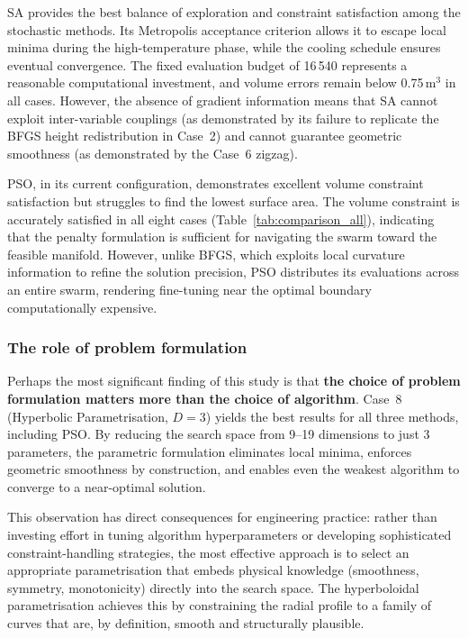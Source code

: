 SA provides the best balance of exploration and constraint satisfaction among the stochastic methods. Its Metropolis acceptance criterion allows it to escape local minima during the high-temperature phase, while the cooling schedule ensures eventual convergence. The fixed evaluation budget of 16\,540 represents a reasonable computational investment, and volume errors remain below 0.75\,m$^3$ in all cases. However, the absence of gradient information means that SA cannot exploit inter-variable couplings (as demonstrated by its failure to replicate the BFGS height redistribution in Case~2) and cannot guarantee geometric smoothness (as demonstrated by the Case~6 zigzag).

PSO, in its current configuration, demonstrates excellent volume constraint satisfaction but struggles to find the lowest surface area. The volume constraint is accurately satisfied in all eight cases (Table~\ref{tab:comparison_all}), indicating that the penalty formulation is sufficient for navigating the swarm toward the feasible manifold. However, unlike BFGS, which exploits local curvature information to refine the solution precision, PSO distributes its evaluations across an entire swarm, rendering fine-tuning near the optimal boundary computationally expensive.

\subsubsection{The role of problem formulation}

Perhaps the most significant finding of this study is that \textbf{the choice of problem formulation matters more than the choice of algorithm}. Case~8 (Hyperbolic Parametrisation, $D = 3$) yields the best results for all three methods, including PSO. By reducing the search space from 9--19 dimensions to just 3 parameters, the parametric formulation eliminates local minima, enforces geometric smoothness by construction, and enables even the weakest algorithm to converge to a near-optimal solution.

This observation has direct consequences for engineering practice: rather than investing effort in tuning algorithm hyperparameters or developing sophisticated constraint-handling strategies, the most effective approach is to select an appropriate parametrisation that embeds physical knowledge (smoothness, symmetry, monotonicity) directly into the search space. The hyperboloidal parametrisation achieves this by constraining the radial profile to a family of curves that are, by definition, smooth and structurally plausible.

